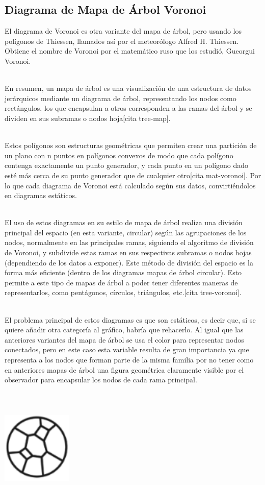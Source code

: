 \documentclass{article}\usepackage[]{graphicx}\usepackage[]{color}
\begin{document}
\subsection{Diagrama de Mapa de \'Arbol Voronoi}
El diagrama de Voronoi es otra variante del mapa de \'arbol, pero usando los pol\'igonos de Thiessen, llamados as\'i por el meteor\'ologo Alfred H. Thiessen. Obtiene el nombre de Voronoi por el matem\'atico ruso que los estudi\'o, Gueorgui Voronoi.~\\~\par
En resumen, un mapa de \'arbol es una visualizaci\'on de una estructura de datos jer\'arquicos mediante un diagrama de \'arbol, representando los nodos como rect\'angulos, los que encapsulan a otros corresponden a las ramas del \'arbol y se dividen en sus subramas o nodos hoja[cita tree-map].~\\~\par
Estos pol\'igonos son estructuras geom\'etricas que permiten crear una partici\'on de un plano con n puntos en pol\'igonos convexos de modo que cada pol\'igono contenga exactamente un punto generador, y cada punto en un pol\'igono dado est\'e m\'as cerca de su punto generador que de cualquier otro[cita mat-voronoi]. Por lo que cada diagrama de Voronoi est\'a calculado seg\'un sus datos, convirti\'endolos en diagramas est\'aticos.~\\~\par
El uso de estos diagramas en su estilo de mapa de \'arbol realiza una divisi\'on principal del espacio (en esta variante, circular) seg\'un las agrupaciones de los nodos, normalmente en las principales ramas, siguiendo el algoritmo de divisi\'on de Voronoi, y subdivide estas ramas en sus respectivas subramas o nodos hojas (dependiendo de los datos a exponer). Este m\'etodo de divisi\'on del espacio es la forma m\'as eficiente (dentro de los diagramas mapas de \'arbol circular). Esto permite a este tipo de mapas de \'arbol a poder tener diferentes maneras de representarlos, como pent\'agonos, c\'irculos, tri\'angulos, etc.[cita tree-voronoi].~\\~\par
El problema principal de estos diagramas es que son est\'aticos, es decir que, si se quiere a\~nadir otra categor\'ia al gr\'afico, habr\'ia que rehacerlo. Al igual que las anteriores variantes del mapa de \'arbol se usa el color para representar nodos conectados, pero en este caso esta variable resulta de gran importancia ya que representa a los nodos que forman parte de la misma familia por no tener como en anteriores mapas de \'arbol una figura geom\'etrica claramente visible por el observador para encapsular los nodos de cada rama principal.
~\\~\\~\\~\\
\vbox{
    \centering
    \includegraphics[width=0.25\textwidth]{imag/poli}
}
\clearpage
\end{document}
